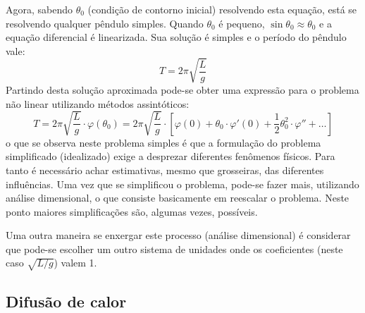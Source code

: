 \documentclass[article,12pt,oneside,a4paper,english,brazil,sumario=tradicional]{abntex2}
\begin{document}
Agora, sabendo $\theta_0$ (condição de contorno inicial) resolvendo esta equação, está se resolvendo qualquer pêndulo simples. Quando $\theta_0$ é pequeno, $\sin\theta_0\approx\theta_0$ e a equação diferencial é linearizada. Sua solução é simples e o período do pêndulo vale:
\[
T = 2\pi\sqrt{\frac{L}{g}}
\]
Partindo desta solução aproximada pode-se obter uma expressão para o problema não linear utilizando métodos assintóticos:
\[
T = 2\pi\sqrt{\frac{L}{g}}\cdot\varphi(\theta_0) = 2\pi \sqrt{\frac{L}{g}} \cdot\left[\varphi(0) + \theta_0\cdot\varphi'(0) +
\frac{1}{2}\theta_0^2\cdot\varphi'' + \ldots\right]
\]
o que se observa neste problema simples é que a formulação do problema simplificado (idealizado) exige a desprezar diferentes fenômenos físicos. Para tanto é necessário achar estimativas, mesmo que grosseiras, das diferentes influências. Uma vez que se simplificou o problema, pode-se fazer mais, utilizando análise dimensional, o que consiste basicamente em reescalar o problema. Neste ponto maiores simplificações são, algumas vezes, possíveis.

Uma outra maneira se enxergar este processo (análise dimensional) é considerar que pode-se escolher um outro sistema de unidades onde os coeficientes (neste caso $\sqrt{L/g}$) valem 1.

\subsection{Difusão de calor}
\end{document}
